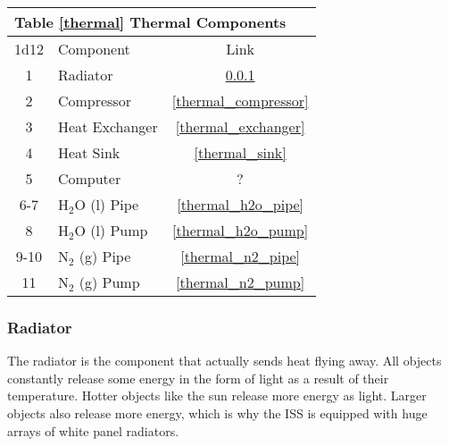\documentclass[a4paper]{article}
\begin{document}
\vspace{0.5cm} \hspace{0.25\linewidth}
\begin{tabular}{| c | l | c |}
\toprule
\multicolumn{3}{|l|}{Table \ref{thermal} Thermal Components} \\
\toprule
1d12 & Component & Link \\
\midrule
1 & Radiator & \ref{thermal_radiator} \\
2 & Compressor & \ref{thermal_compressor} \\
3 & Heat Exchanger & \ref{thermal_exchanger} \\
4 & Heat Sink & \ref{thermal_sink} \\
5 & Computer & ? \\
6-7 & H$_2$O (l) Pipe & \ref{thermal_h2o_pipe} \\
8 & H$_2$O (l) Pump & \ref{thermal_h2o_pump} \\
9-10 & N$_2$ (g) Pipe & \ref{thermal_n2_pipe} \\
11 & N$_2$ (g) Pump & \ref{thermal_n2_pump} \\
\bottomrule
\end{tabular}

\hspace{-18pt} \subsubsection{Radiator} \label{thermal_radiator} \vspace{-0.2cm}

The radiator is the component that actually sends heat flying away. All objects constantly release some energy in the form of light as a result of their temperature. Hotter objects like the sun release more energy as light. Larger objects also release more energy, which is why the ISS is equipped with huge arrays of white panel radiators.
\end{document}
